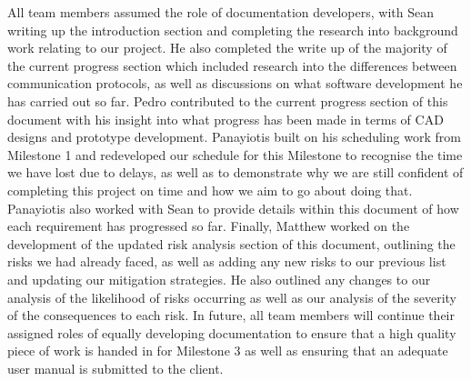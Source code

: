 All team members assumed the role of documentation developers, with Sean writing up the introduction section and completing the research into background work relating to our project. He also completed the write up of the majority of the current progress section which included research into the differences between communication protocols, as well as discussions on what software development he has carried out so far. Pedro contributed to the current progress section of this document with his insight into what progress has been made in terms of CAD designs and prototype development. Panayiotis built on his scheduling work from Milestone 1 and redeveloped our schedule for this Milestone to recognise the time we have lost due to delays, as well as to demonstrate why we are still confident of completing this project on time and how we aim to go about doing that. Panayiotis also worked with Sean to provide details within this document of how each requirement has progressed so far. Finally, Matthew worked on the development of the updated risk analysis section of this document, outlining the risks we had already faced, as well as adding any new risks to our previous list and updating our mitigation strategies. He also outlined any changes to our analysis of the likelihood of risks occurring as well as our analysis of the severity of the consequences to each risk. In future, all team members will continue their assigned roles of equally developing documentation to ensure that a high quality piece of work is handed in for Milestone 3 as well as ensuring that an adequate user manual is submitted to the client. 